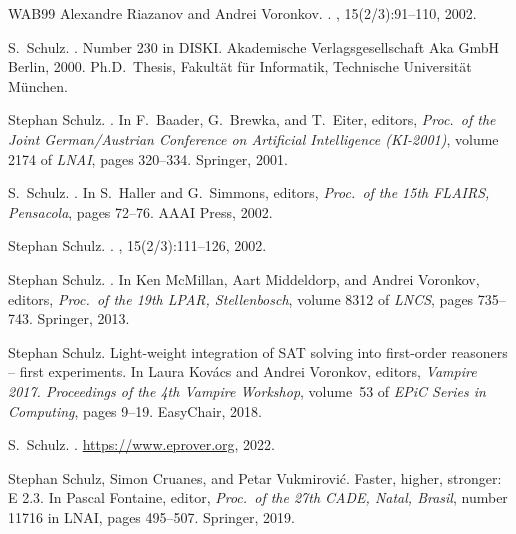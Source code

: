\documentclass{report}
\begin{document}
\begin{thebibliography}{WAB{\etalchar{+}}99}
Alexandre Riazanov and Andrei Voronkov.
.
, 15(2/3):91--110, 2002.

S.~Schulz.
.
\newblock Number 230 in DISKI. Akademische Verlagsgesellschaft Aka GmbH Berlin,
  2000.
\newblock Ph.D.~Thesis, Fakult{\"a}t f{\"u}r Informatik, Technische
  Universit{\"a}t M{\"u}nchen.

Stephan Schulz.
.
\newblock In F.~Baader, G.~Brewka, and T.~Eiter, editors, {\em Proc.\ of the
  Joint German/Austrian Conference on Artificial Intelligence (KI-2001)},
  volume 2174 of {\em LNAI}, pages 320--334. Springer, 2001.

S.~Schulz.
.
\newblock In S.~Haller and G.~Simmons, editors, {\em Proc.\ of the 15th FLAIRS,
  Pensacola}, pages 72--76. AAAI Press, 2002.

Stephan Schulz.
.
, 15(2/3):111--126, 2002.

Stephan Schulz.
.
\newblock In Ken McMillan, Aart Middeldorp, and Andrei Voronkov, editors, {\em
  Proc.\ of the 19th LPAR, Stellenbosch}, volume 8312 of {\em LNCS}, pages
  735--743. Springer, 2013.

Stephan Schulz.
\newblock Light-weight integration of {SAT} solving into first-order reasoners
  -- first experiments.
\newblock In Laura Kov{\'a}cs and Andrei Voronkov, editors, {\em Vampire 2017.
  Proceedings of the 4th Vampire Workshop}, volume~53 of {\em EPiC Series in
  Computing}, pages 9--19. EasyChair, 2018.

S.~Schulz.
.
\newblock \url{https://www.eprover.org}, 2022.

Stephan Schulz, Simon Cruanes, and Petar Vukmirovi{\'c}.
\newblock Faster, higher, stronger: {E} 2.3.
\newblock In Pascal Fontaine, editor, {\em Proc.\ of the 27th CADE, Natal,
  Brasil}, number 11716 in LNAI, pages 495--507. Springer, 2019.


\end{thebibliography}
\end{document}
